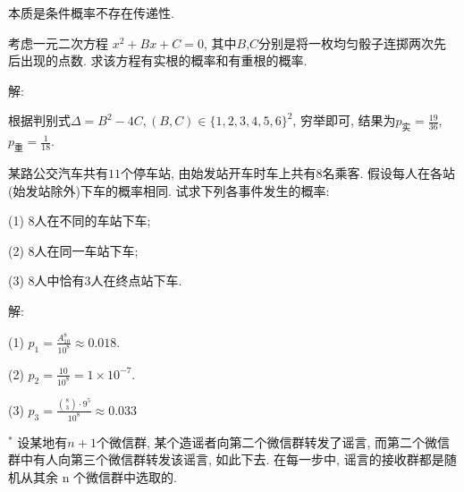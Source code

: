 \documentclass[standard]{ExBook}
\begin{document}
\begin{qitems}
\begin{bbox}
\textcolor{themeColor}{\selectfont {} 本质是条件概率不存在传递性.}
    \end{bbox}

\vspace{-5em}

    \begin{bbox}
    \begin{shaded}
        \qitem
考虑一元二次方程 $x^{2} + Bx + C = 0$, 其中$B$,$C$分别是将一枚均匀骰子连掷两次先后出现的点数. 求该方程有实根的概率和有重根的概率.
    \end{shaded}
    \end{bbox}

\vspace{-5em}

    \begin{bbox}
解: 

根据判别式$\Delta=B^2-4C,(B,C)\in\{1,2,3,4,5,6\}^2$, 穷举即可, 结果为$p_{\text{实}}=\frac{19}{36}$, $p_{\text{重}}=\frac{1}{18}$.
    \end{bbox}

\vspace{-5em}

    \begin{bbox}
    \begin{shaded}
        \qitem
某路公交汽车共有$11$个停车站, 由始发站开车时车上共有8名乘客. 假设每人在各站(始发站除外)下车的概率相同. 试求下列各事件发生的概率:

(1) 8人在不同的车站下车;

(2) 8人在同一车站下车;

(3) 8人中恰有3人在终点站下车.
    \end{shaded}
    \end{bbox}

\vspace{-5em}

    \begin{bbox}
解: 

(1) $p_{1}=\frac{A_{10}^{8}}{10^8}\approx0.018$.

(2) $p_{2}=\frac{10}{10^8}=1\times10^{-7}$.

(3) $p_{3}=\frac{\binom{8}{3}\cdot 9^5}{10^8}\approx0.033$
    \end{bbox}

\vspace{-5em}

    \begin{bbox}
    \begin{shaded}
        \qitem$^{*}$
设某地有$n + 1$个微信群, 某个造谣者向第二个微信群转发了谣言, 而第二个微信群中有人向第三个微信群转发该谣言, 如此下去. 在每一步中, 谣言的接收群都是随机从其余 n 个微信群中选取的.


\end{shaded}
\end{bbox}
\end{qitems}
\end{document}
